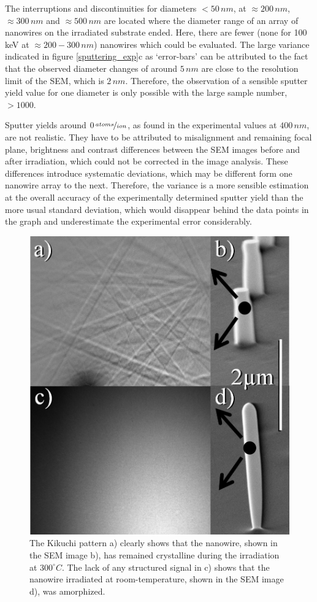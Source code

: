 The interruptions and discontinuities for diameters $<50\,nm$, at $\approx 200\,nm$, $\approx 300\,nm$ and $\approx 500\,nm$ are located where the diameter range of an array of nanowires on the irradiated substrate ended. Here, there are fewer (none for 100\,keV at $\approx 200 - 300\,nm$) nanowires which could be evaluated. The large variance indicated in figure \ref{sputtering_exp}c as `error-bars' can be attributed to the fact that the observed diameter changes of around $5\,nm$ are close to the resolution limit of the SEM, which is $2\,nm$. Therefore, the observation of a sensible sputter yield value for one diameter is only possible with the large sample number, $>1000$.

Sputter yields around $0\,\nicefrac{atoms}{ion}$, as found in the experimental values at $400\,nm$, are not realistic. They have to be attributed to misalignment and remaining focal plane, brightness and contrast differences between the SEM images before and after irradiation, which could not be corrected in the image analysis. These differences introduce systematic deviations, which may be different form one nanowire array to the next. Therefore, the variance is a more sensible estimation at the overall accuracy of the experimentally determined sputter yield than the more usual standard deviation, which would disappear behind the data points in the graph and underestimate the experimental error considerably.

\begin{figure}
	\centering
		\includegraphics[width=.3\textwidth]{images/EBSD.jpg}
	\caption{The Kikuchi pattern a) clearly shows that the nanowire, shown in the SEM image b), has remained crystalline during the irradiation at $300^\circ C$. The lack of any structured signal in c) shows that the nanowire irradiated at room-temperature, shown in the SEM image d), was amorphized.} 
	\label{EBSD}
\end{figure}

